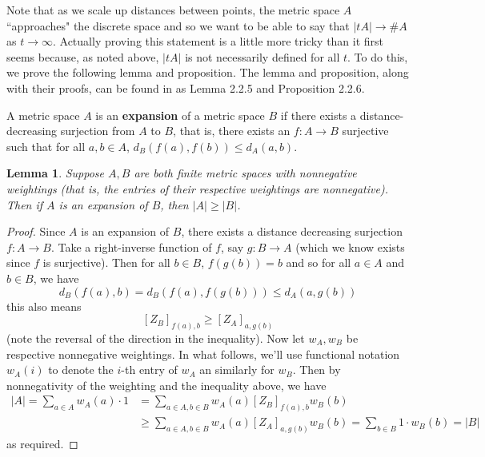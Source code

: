 \documentclass[11pt]{article}
\theoremstyle{mythm}
\newtheorem{lem}[defn]{Lemma}
\begin{document}
Note that as we scale up distances between points, the metric space $A$ ``approaches" the discrete space and so we want to be able to say that $\vert tA \vert \to \#A$ as $t \to \infty$. Actually proving this statement is a little more tricky than it first seems because, as noted above, $\vert tA \vert$ is not necessarily defined for all $t$. To do this, we prove the following lemma and proposition. The lemma and proposition, along with their proofs, can be found in \cite{leinster_magnitude_2011} as Lemma 2.2.5 and Proposition 2.2.6.

A metric space $A$ is an \textbf{expansion} of a metric space $B$ if there exists a distance-decreasing surjection from $A$ to $B$, that is, there exists an $f: A \to B$ surjective such that for all $a,b \in A$, $d_{B}(f(a),f(b)) \leq d_{A}(a,b)$.

\begin{lem}\label{lem:expansion}
Suppose $A,B$ are both finite metric spaces with nonnegative weightings (that is, the entries of their respective weightings are nonnegative). Then if $A$ is an expansion of $B$, then $\vert A \vert \geq \vert B \vert$.
\end{lem}

\begin{proof}
Since $A$ is an expansion of $B$, there exists a distance decreasing surjection $f: A \to B$. Take a right-inverse function of $f$, say $g: B \to A$ (which we know exists since $f$ is surjective). Then for all $b \in B$, $f(g(b)) = b$ and so for all $a \in A$ and $b \in B$, we have
\begin{equation*}
d_{B}(f(a),b) = d_{B}(f(a),f(g(b))) \leq d_{A}(a,g(b))
\end{equation*}
this also means
\begin{equation*}
\left[Z_B\right]_{f(a),b} \geq \left[Z_{A}\right]_{a,g(b)}
\end{equation*}
(note the reversal of the direction in the inequality). Now let $w_A,w_B$ be respective nonnegative weightings. In what follows, we'll use functional notation $w_A(i)$ to denote the $i$-th entry of $w_A$ an similarly for $w_B$. Then by nonnegativity of the weighting and the inequality above, we have
\begin{align*}
\vert A \vert = \sum\limits_{a\in A} w_A(a) \cdot 1 &= \sum\limits_{a\in A, b\in B} w_A(a) \left[Z_{B}\right]_{f(a),b}w_B(b) \\
&\geq \sum\limits_{a\in A, b \in B} w_{A}(a) \left[Z_{A}\right]_{a,g(b)} w_{B}(b) = \sum\limits_{b\in B} 1\cdot w_B(b) = \vert B \vert
\end{align*}
as required.
\end{proof}
\end{document}
